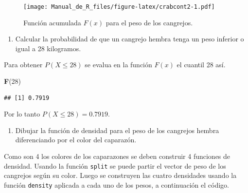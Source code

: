 \documentclass[10pt,]{krantz}
\makeatletter
\newenvironment{Shaded}{\begin{snugshade}}{\end{snugshade}}
\newcommand{\KeywordTok}[1]{\textcolor[rgb]{0.13,0.29,0.53}{\textbf{{#1}}}}
\newcommand{\DataTypeTok}[1]{\textcolor[rgb]{0.13,0.29,0.53}{{#1}}}
\newcommand{\DecValTok}[1]{\textcolor[rgb]{0.00,0.00,0.81}{{#1}}}
\newcommand{\StringTok}[1]{\textcolor[rgb]{0.31,0.60,0.02}{{#1}}}
\newcommand{\NormalTok}[1]{{#1}}
\providecommand{\tightlist}{%
  \setlength{\itemsep}{0pt}\setlength{\parskip}{0pt}}
\newenvironment{kframe}{%
\medskip{}
\setlength{\fboxsep}{.8em}
 \def\at@end@of@kframe{}%
 \ifinner\ifhmode%
  \def\at@end@of@kframe{\end{minipage}}%
  \begin{minipage}{\columnwidth}%
 \fi\fi%
 \def\FrameCommand##1{\hskip\@totalleftmargin \hskip-\fboxsep
 \colorbox{shadecolor}{##1}\hskip-\fboxsep
     \hskip-\linewidth \hskip-\@totalleftmargin \hskip\columnwidth}%
 \MakeFramed {\advance\hsize-\width
   \@totalleftmargin\z@ \linewidth\hsize
   \@setminipage}}%
 {\par\unskip\endMakeFramed%
 \at@end@of@kframe}
\renewenvironment{Shaded}{\begin{kframe}}{\end{kframe}}
\makeatother
\begin{document}
\begin{figure}[htbp]
\centering
\texttt{[image: Manual\_de\_R\_files/figure-latex/crabcont2-1.pdf]}
\caption{\label{fig:crabcont2}Función acumulada \(F(x)\) para el peso de los
cangrejos.}
\end{figure}

\begin{enumerate}
\def\labelenumi{\arabic{enumi})}
\setcounter{enumi}{2}
\tightlist
\item
  Calcular la probabilidad de que un cangrejo hembra tenga un peso
  inferior o igual a 28 kilogramos.
\end{enumerate}

Para obtener \(P(X \leq 28)\) se evalua en la función \(F(x)\) el
cuantil 28 así.

\begin{Shaded}
\begin{Highlighting}[]
\KeywordTok{F}\NormalTok{(}\DecValTok{28}\NormalTok{)}
\end{Highlighting}
\end{Shaded}

\begin{verbatim}
## [1] 0.7919
\end{verbatim}

Por lo tanto \(P(X \leq 28)=0.7919\).

\begin{enumerate}
\def\labelenumi{\arabic{enumi})}
\setcounter{enumi}{3}
\tightlist
\item
  Dibujar la función de densidad para el peso de los cangrejos hembra
  diferenciando por el color del caparazón.
\end{enumerate}

Como son 4 los colores de los caparazones se deben construir 4 funciones
de densidad. Usando la función \texttt{split} se puede partir el vector
de peso de los cangrejos según su color. Luego se construyen las cuatro
densidades usando la función \texttt{density} aplicada a cada uno de los
pesos, a continuación el código.

\begin{Shaded}
\end{Shaded}
\end{document}
